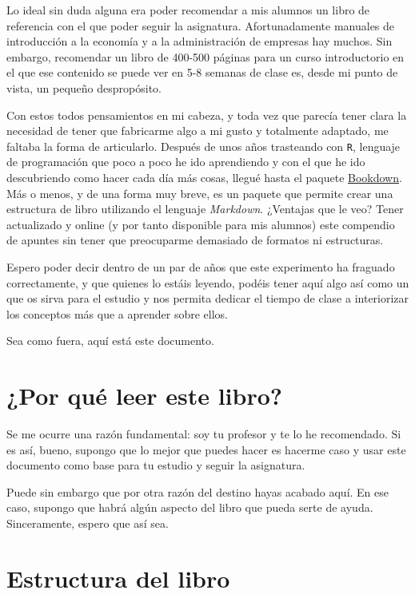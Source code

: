 \documentclass[
]{krantz}
\begin{document}
Lo ideal sin duda alguna era poder recomendar a mis alumnos un libro de referencia con el que poder seguir la asignatura. Afortunadamente manuales de introducción a la economía y a la administración de empresas hay muchos. Sin embargo, recomendar un libro de 400-500 páginas para un curso introductorio en el que ese contenido se puede ver en 5-8 semanas de clase es, desde mi punto de vista, un pequeño despropósito.

Con estos todos pensamientos en mi cabeza, y toda vez que parecía tener clara la necesidad de tener que fabricarme algo a mi gusto y totalmente adaptado, me faltaba la forma de articularlo. Después de unos años trasteando con \texttt{R}, lenguaje de programación que poco a poco he ido aprendiendo y con el que he ido descubriendo como hacer cada día más cosas, llegué hasta el paquete \href{https://bookdown.org/}{Bookdown}. Más o menos, y de una forma muy breve, es un paquete que permite crear una estructura de libro utilizando el lenguaje \emph{Markdown}. ¿Ventajas que le veo? Tener actualizado y online (y por tanto disponible para mis alumnos) este compendio de apuntes sin tener que preocuparme demasiado de formatos ni estructuras.

Espero poder decir dentro de un par de años que este experimento ha fraguado correctamente, y que quienes lo estáis leyendo, podéis tener aquí algo así como un que os sirva para el estudio y nos permita dedicar el tiempo de clase a interiorizar los conceptos más que a aprender sobre ellos.

Sea como fuera, aquí está este documento.

\hypertarget{por-quuxe9-leer-este-libro}{%
\section*{¿Por qué leer este libro?}\label{por-quuxe9-leer-este-libro}}


Se me ocurre una razón fundamental: soy tu profesor y te lo he recomendado. Si es así, bueno, supongo que lo mejor que puedes hacer es hacerme caso y usar este documento como base para tu estudio y seguir la asignatura.

Puede sin embargo que por otra razón del destino hayas acabado aquí. En ese caso, supongo que habrá algún aspecto del libro que pueda serte de ayuda. Sinceramente, espero que así sea.

\hypertarget{estructura-del-libro}{%
\section*{Estructura del libro}\label{estructura-del-libro}}
\end{document}
